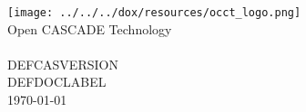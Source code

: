\documentclass[oneside]{article}
\begin{document}
\hypersetup{pageanchor=false}
\begin{titlepage}
\vspace*{7cm}
\begin{center}%
\texttt{[image: ../../../dox/resources/occt\_logo.png]}\\
{\Large Open C\-A\-S\-C\-A\-D\-E Technology \\\\\Large DEFCASVERSION }\\
\vspace*{1cm}
{\Large DEFDOCLABEL}\\
\vspace*{1cm}
\vspace*{0.5cm}
{\small \today}\
\end{center}
\end{titlepage}
\clearpage
{}
\tableofcontents
\newpage
{}
\hypersetup{pageanchor=true}

\let\stdsection\section
  \renewcommand\section{\pagebreak\stdsection}
\hypertarget{DEFFILENAME}{}


\newpage
{}
{}
\printindex\n
\end{document}
